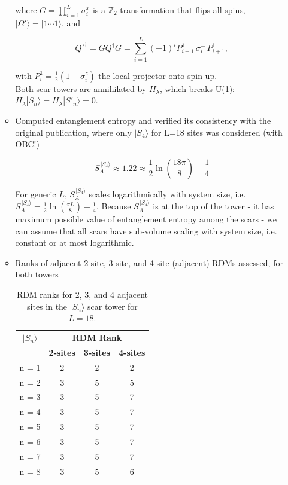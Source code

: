 \documentclass[11pt]{article}
\begin{document}
\begin{itemize}
\begin{itemize}
	\noindent where $G = \prod_{i=1}^L \sigma_i^x$ is a $\mathbb{Z}_2$ transformation that flips all spins, 
	$|\Omega'\rangle = |1 \cdots 1\rangle$, and
	
	\begin{equation}
	Q'^\dagger = G Q^\dagger G = \sum_{i = 1}^{L} (-1)^i P^1_{i-1} \, \sigma^-_i \, P^1_{i+1},
	\end{equation}
	
	\noindent with $P^1_i = \frac{1}{2}(1 + \sigma^z_i)$ the local projector onto spin up.\\
	Both scar towers are annihilated by $H_{\lambda}$, which breaks U(1): $H_{\lambda} |S_n\rangle = H_{\lambda} |S'_n\rangle = 0$.
        \item Computed entanglement entropy and verified its consistency with the original publication, where only $|S_4\rangle$ for L=18 sites was considered (with OBC!)
        
        \begin{equation}
        S^{\,|S_4\rangle}_A \approx 1.22 \approx \frac{1}{2} \ln \left(\frac{18 \pi}{8}\right) + \frac{1}{4}
        \end{equation}
        
        For generic $L$, $S^{\,|S_4\rangle}_A$ scales logarithmically with system size, i.e. $S^{\,|S_4\rangle}_A = \frac{1}{2} \ln \left(\frac{\pi L}{8}\right) + \frac{1}{4}$. Because $S^{\,|S_4\rangle}_A$ is at the top of the tower - it has maximum possible 				value of entanglement entropy among the scars - we can assume that all scars have sub-volume scaling with system size, i.e. constant or at most logarithmic.
        
        \item Ranks of adjacent 2-site, 3-site, and 4-site (adjacent) RDMs assessed, for both towers
        
        \begin{table}[H]
	\centering
	\begin{tabular}{|c|ccc|}
	\hline
	\textbf{$|S_n\rangle$} & \multicolumn{3}{c|}{\textbf{RDM Rank}} \\
	\cline{2-4}
	& \textbf{2-sites} & \textbf{3-sites} & \textbf{4-sites} \\
	\hline
	 n = 1 & 2 & 2 & 2 \\
	 n = 2 & 3 & 5 & 5 \\
	 n = 3 & 3 & 5 & 7 \\
	 n = 4 & 3 & 5 & 7 \\  
	 n = 5 & 3 & 5 & 7 \\
	 n = 6 & 3 & 5 & 7 \\
	 n = 7 & 3 & 5 & 7 \\
	 n = 8 & 3 & 5 & 6 \\
	\hline
	\end{tabular}
	\caption{RDM ranks for 2, 3, and 4 adjacent sites in the $|S_n\rangle$ scar tower for $L=18$.}
	\label{tab:ranks1}
	\end{table}


\end{itemize}
\end{itemize}
\end{document}
